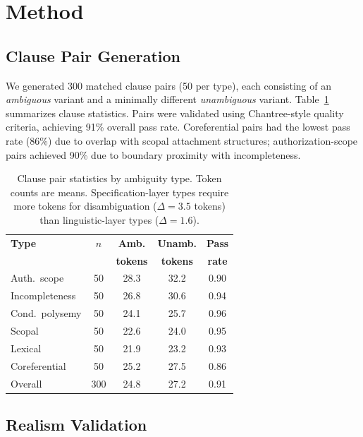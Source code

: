 \documentclass[11pt]{article}
\begin{document}
\section{Method}
\label{sec:method}

\subsection{Clause Pair Generation}

We generated 300 matched clause pairs (50 per type), each consisting of an \emph{ambiguous} variant and a minimally different \emph{unambiguous} variant. Table~\ref{tab:clause_stats} summarizes clause statistics. Pairs were validated using Chantree-style quality criteria, achieving 91\% overall pass rate. Coreferential pairs had the lowest pass rate (86\%) due to overlap with scopal attachment structures; authorization-scope pairs achieved 90\% due to boundary proximity with incompleteness.

\begin{table}[t]
\centering
\small
\begin{tabular}{lcccc}
\toprule
\textbf{Type} & \textbf{$n$} & \textbf{Amb.} & \textbf{Unamb.} & \textbf{Pass} \\
 & & \textbf{tokens} & \textbf{tokens} & \textbf{rate} \\
\midrule
Auth.\ scope & 50 & 28.3 & 32.2 & 0.90 \\
Incompleteness & 50 & 26.8 & 30.6 & 0.94 \\
Cond.\ polysemy & 50 & 24.1 & 25.7 & 0.96 \\
Scopal & 50 & 22.6 & 24.0 & 0.95 \\
Lexical & 50 & 21.9 & 23.2 & 0.93 \\
Coreferential & 50 & 25.2 & 27.5 & 0.86 \\
\midrule
Overall & 300 & 24.8 & 27.2 & 0.91 \\
\bottomrule
\end{tabular}
\caption{Clause pair statistics by ambiguity type. Token counts are means. Specification-layer types require more tokens for disambiguation ($\Delta = 3.5$ tokens) than linguistic-layer types ($\Delta = 1.6$).}
\label{tab:clause_stats}
\end{table}

\subsection{Realism Validation}
\end{document}
